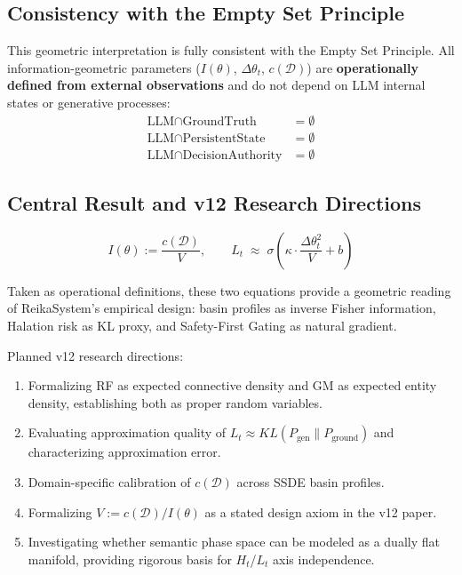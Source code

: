 \documentclass[11pt,a4paper]{article}
\begin{document}
\subsection{Consistency with the Empty Set Principle}

This geometric interpretation is fully consistent with the Empty Set Principle.
All information-geometric parameters ($I(\theta)$, $\Delta\theta_t$, $c(\mathcal{D})$)
are \textbf{operationally defined from external observations}
and do not depend on LLM internal states or generative processes:
\begin{align}
\text{LLM} \cap \text{GroundTruth}      &= \emptyset \\
\text{LLM} \cap \text{PersistentState}  &= \emptyset \\
\text{LLM} \cap \text{DecisionAuthority}&= \emptyset
\end{align}

\subsection{Central Result and v12 Research Directions}

\begin{equation}
\boxed{
I(\theta) := \frac{c(\mathcal{D})}{V},
\qquad
L_t \;\approx\; \sigma\!\left(\kappa \cdot \frac{\Delta\theta_t^2}{V} + b\right)
}
\end{equation}

Taken as operational definitions, these two equations provide a geometric reading of
ReikaSystem's empirical design: basin profiles as inverse Fisher information,
Halation risk as KL proxy, and Safety-First Gating as natural gradient.

Planned v12 research directions:
\begin{enumerate}
\item Formalizing RF as expected connective density and GM as expected entity density,
      establishing both as proper random variables.
\item Evaluating approximation quality of $L_t \approx KL(P_\text{gen} \| P_\text{ground})$
      and characterizing approximation error.
\item Domain-specific calibration of $c(\mathcal{D})$ across SSDE basin profiles.
\item Formalizing $V := c(\mathcal{D})/I(\theta)$ as a stated design axiom in the v12 paper.
\item Investigating whether semantic phase space can be modeled as a dually flat manifold,
      providing rigorous basis for $H_t$/$L_t$ axis independence.
\end{enumerate}
\end{document}
